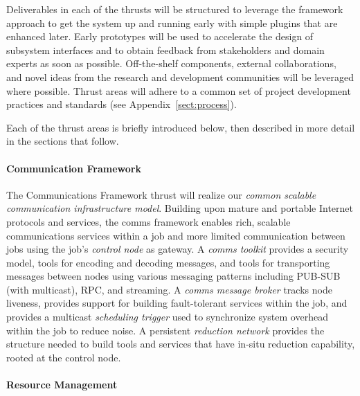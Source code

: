 \documentclass{article}
\begin{document}
Deliverables in each of the thrusts will be structured 
to leverage the framework approach to get the system up and running
early with simple plugins that are enhanced later.
Early prototypes will be used to accelerate the design of subsystem
interfaces and to obtain feedback from stakeholders and domain experts
as soon as possible.
Off-the-shelf components, external collaborations, and novel ideas from
the research and development communities will be leveraged where possible.
Thrust areas will adhere to a common set of project development practices
and standards (see Appendix~\ref{sect:process}).

Each of the thrust areas is briefly introduced below, then described in
more detail in the sections that follow.

\paragraph{Communication Framework}
The Communications Framework thrust will
realize our {\em common scalable communication infrastructure model}.
Building upon mature and portable Internet protocols and services,
the comms framework enables rich, scalable communications services
within a job and more limited communication between jobs using
the job's {\em control node} as gateway.
A {\em comms toolkit} provides a security model, tools for
encoding and decoding messages, and tools for transporting messages between
nodes using various messaging patterns including PUB-SUB (with multicast),
RPC, and streaming.
A {\em comms message broker} tracks node liveness, provides support for
building fault-tolerant services within the job,
and provides a multicast {\em scheduling trigger} used to synchronize
system overhead within the job to reduce noise.
A persistent {\em reduction network}
provides the structure needed to build tools and services that have
in-situ reduction capability, rooted at the control node.

\paragraph{Resource Management}
\end{document}
